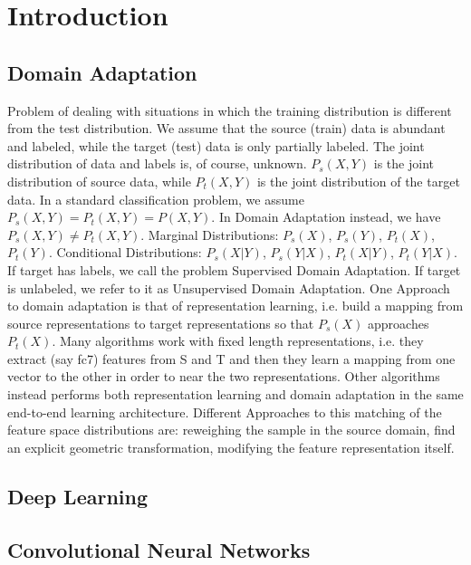 \documentclass[../main.tex]{subfiles}
\begin{document}
    \section{Introduction}

    \subsection{Domain Adaptation}
    Problem of dealing with situations in which the training distribution is different from the test distribution.
    We assume that the source (train) data is abundant and labeled, while the target (test) data is only partially
    labeled. The joint distribution of data and labels is, of course, unknown. $ P_{s}(X, Y) $ is the joint distribution
    of source data, while $ P_{t}(X, Y) $ is the joint distribution of the target data. In a standard classification
    problem, we assume $ P_{s}(X, Y) = P_{t}(X, Y) = P(X, Y) $. In Domain Adaptation instead, we have $ P_{s}(X, Y) \neq P_{t}(X, Y) $.
    Marginal Distributions: $ P_{s}(X) $, $ P_{s}(Y) $, $ P_{t}(X) $, $ P_{t}(Y) $.
    Conditional Distributions: $ P_{s}(X | Y) $, $ P_{s}(Y | X) $, $ P_{t}(X | Y) $, $ P_{t}(Y | X) $.
    If target has labels, we call the problem Supervised Domain Adaptation. If target is unlabeled, we refer to it as Unsupervised Domain
    Adaptation.
    One Approach to domain adaptation is that of representation learning, i.e. build a mapping from source representations to target
    representations so that $ P_{s}(X) $ approaches $ P_{t}(X) $. Many algorithms work with fixed length representations, i.e. they
    extract (say fc7) features from S and T and then they learn a mapping from one vector to the other in order to near the two
    representations. Other algorithms instead performs both representation learning and domain adaptation in the same end-to-end
    learning architecture.
    Different Approaches to this matching of the feature space distributions are: reweighing the sample in the source domain, find
    an explicit geometric transformation, modifying the feature representation itself.

    \subsection{Deep Learning}

    \subsection{Convolutional Neural Networks}
\end{document}

